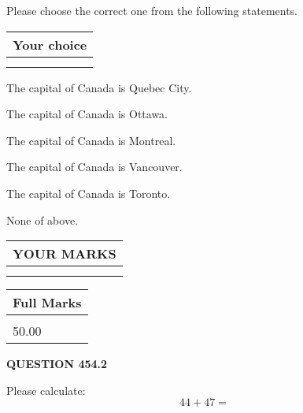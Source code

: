 \documentclass[12pt]{article}
\begin{document}
  
Please choose the correct one from the following statements.
  
  
\noindent\hspace{3.0in} \begin{tabular}{|l|}
\hline
Your choice \\
\hline
 \\ 
 \\ 
\hline
\end{tabular}
  
  
 
 
The capital of Canada is Quebec City.
 
 
The capital of Canada is Ottawa.
 
 
The capital of Canada is Montreal.
 
 
The capital of Canada is Vancouver.
 
 
The capital of Canada is Toronto.
 
 
 None of above.
 
 
  
\vspace{0.2in}
  
\noindent\begin{tabular}{|l|}
\hline
 YOUR MARKS  \\
\hline
 \\ 
 \\ 
\hline
\end{tabular}
\hspace{0.05in} \begin{tabular}{|l|}
\hline
 Full Marks  \\
\hline
 \\ 
50.00 \\
\hline
\end{tabular}
{\textbf{\Large{QUESTION
454.2 
}}}
  
  
 
Please calculate:
\begin{equation}
44 +  %
47 = \nonumber
\end{equation}
 

 

 
   
   
 \vspace{0.2in}
 
   
   
   
   
\end{document}
